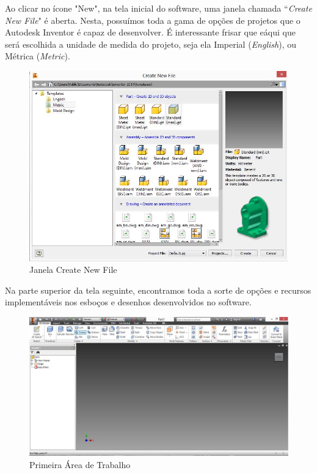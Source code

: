 	Ao clicar no \'icone "New", na tela inicial do software, uma janela chamada  ``{\it Create New File}" é aberta. Nesta, possu\'imos toda a gama de op\c{c}\~oes de projetos que o Autodesk Inventor \'e capaz de desenvolver. \'E interessante frisar que e\' aqui que ser\'a escolhida a unidade de medida do projeto, seja ela Imperial ({\it English}), ou M\'etrica ({\it Metric}).
	
	\begin{figure}[h]
	\includegraphics[scale=0.5]{./include/chapters/sections/mec/section1/imgs/first_wdw.jpg}
	\caption{Janela Create New File}
	\label{CreateNew}
	\end{figure}
\newpage
	Na parte superior da tela seguinte, encontramos toda a sorte de opç\~oes e recursos implement\'aveis nos esbo\c{c}os e desenhos desenvolvidos no software.
	\\
	\begin{figure}[h]
	\includegraphics[scale=0.3]{./include/chapters/sections/mec/section1/imgs/sec.jpg}
	\caption{Primeira \'Area de Trabalho}
	\label{Desktop}
	\end{figure}
	\\
